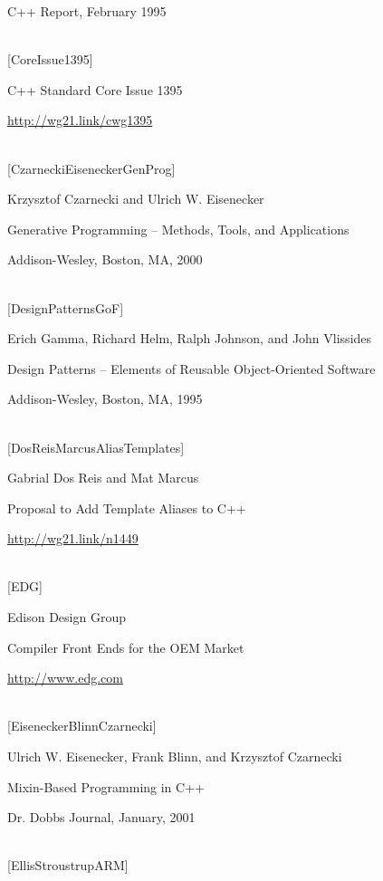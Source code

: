 C++ Report, February 1995

\hspace*{\fill} \\ %
{[CoreIssue1395]}

C++ Standard Core Issue 1395

\url{http://wg21.link/cwg1395}

\hspace*{\fill} \\ %
{[CzarneckiEiseneckerGenProg]}

Krzysztof Czarnecki and Ulrich W. Eisenecker

Generative Programming – Methods, Tools, and Applications

Addison-Wesley, Boston, MA, 2000

\hspace*{\fill} \\ %
{[DesignPatternsGoF]}

Erich Gamma, Richard Helm, Ralph Johnson, and John Vlissides

Design Patterns – Elements of Reusable Object-Oriented Software

Addison-Wesley, Boston, MA, 1995

\hspace*{\fill} \\ %
{[DosReisMarcusAliasTemplates]}

Gabrial Dos Reis and Mat Marcus

Proposal to Add Template Aliases to C++

\url{http://wg21.link/n1449}

\hspace*{\fill} \\ %
{[EDG]}

Edison Design Group

Compiler Front Ends for the OEM Market

\url{http://www.edg.com}

\hspace*{\fill} \\ %
{[EiseneckerBlinnCzarnecki]}

Ulrich W. Eisenecker, Frank Blinn, and Krzysztof Czarnecki

Mixin-Based Programming in C++

Dr. Dobbs Journal, January, 2001

\hspace*{\fill} \\ %
{[EllisStroustrupARM]}

